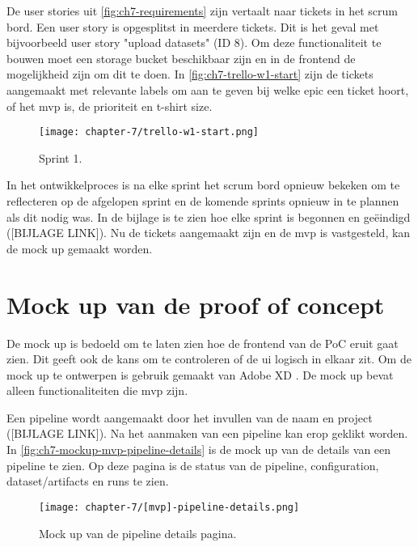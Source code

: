 De user stories uit \autoref{fig:ch7-requirements} zijn vertaalt naar tickets in het scrum bord. Een user story is opgesplitst in meerdere tickets. Dit is het geval met bijvoorbeeld user story "upload datasets" (ID 8). Om deze functionaliteit te bouwen moet een storage bucket beschikbaar zijn en in de frontend de mogelijkheid zijn om dit te doen. In \autoref{fig:ch7-trello-w1-start} zijn de tickets aangemaakt met relevante labels om aan te geven bij welke epic een ticket hoort, of het \acrshort{mvp} is, de prioriteit en t-shirt size.

\begin{figure}[hbt!]
  \centering
  \texttt{[image: chapter-7/trello-w1-start.png]}
  \caption{Sprint 1.}
  \label{fig:ch7-trello-w1-start}
\end{figure}

In het ontwikkelproces is na elke sprint het scrum bord opnieuw bekeken om te reflecteren op de afgelopen sprint en de komende sprints opnieuw in te plannen als dit nodig was. In de bijlage is te zien hoe elke sprint is begonnen en geëindigd ([BIJLAGE LINK]). Nu de tickets aangemaakt zijn en de \acrshort{mvp} is vastgesteld, kan de mock up gemaakt worden.

\section{Mock up van de proof of concept}\label{sec:ch7-mock-up-van-de-proof-of-concept}
De mock up is bedoeld om te laten zien hoe de frontend van de PoC eruit gaat zien. Dit geeft ook de kans om te controleren of de \acrfull{ui} logisch in elkaar zit. Om de mock up te ontwerpen is gebruik gemaakt van Adobe XD \cite{adobe-xd}. De mock up bevat alleen functionaliteiten die \acrshort{mvp} zijn. 

Een pipeline wordt aangemaakt door het invullen van de naam en project ([BIJLAGE LINK]). Na het aanmaken van een pipeline kan erop geklikt worden. In \autoref{fig:ch7-mockup-mvp-pipeline-details} is de mock up van de details van een pipeline te zien. Op deze pagina is de status van de pipeline, configuration, dataset/\glspl{artifact} en runs te zien.

\begin{figure}[hbt!]
  \centering
  \texttt{[image: chapter-7/[mvp]-pipeline-details.png]}
  \caption{Mock up van de pipeline details pagina.}
  \label{fig:ch7-mockup-mvp-pipeline-details}
\end{figure}

